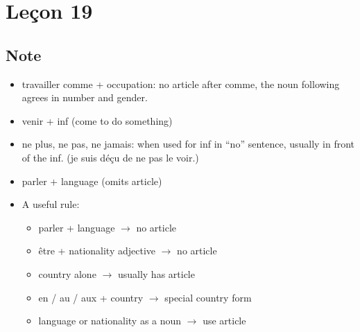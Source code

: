 \documentclass{book}
\begin{document}
\chapter{Leçon 19}
    \section{Note}
        \begin{itemize}
            \item travailler comme + occupation: no article after comme, the noun following agrees in number and gender.
            \item venir + inf (come to do something)
            \item ne plus, ne pas, ne jamais: when used for inf in ``no'' sentence, usually in front of the inf. (je suis déçu de ne pas le voir.)
            \item parler + language (omits article)
            \item A useful rule:
                \begin{itemize}
                    \item parler + language \(\to\) no article
                    \item être + nationality adjective \(\to\) no article
                    \item country alone \(\to\) usually has article
                    \item en / au / aux + country \(\to\) special country form
                    \item language or nationality as a noun \(\to\) use article
                \end{itemize}
        \end{itemize}
\end{document}

